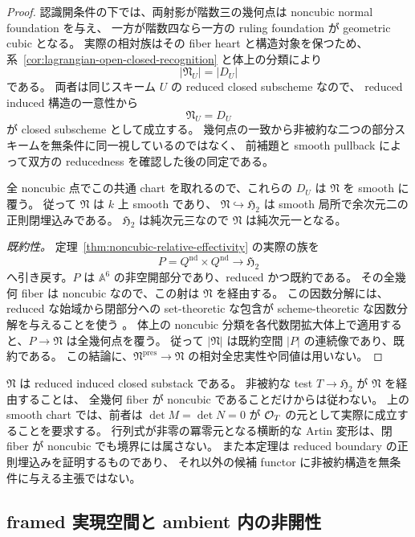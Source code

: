 \begin{proof}
認識開条件の下では、両射影が階数三の幾何点は noncubic normal foundation を与え、
一方が階数四なら一方の ruling foundation が geometric cubic となる。
実際の相対族はその fiber heart と構造対象を保つため、
系~\ref{cor:lagrangian-open-closed-recognition} と体上の分類により
\[
 |\mathfrak N_U|=|D_U|
\]
である。
両者は同じスキーム $U$ の reduced closed subscheme なので、
reduced induced 構造の一意性から
\[
 \mathfrak N_U=D_U
\]
が closed subscheme として成立する。
幾何点の一致から非被約な二つの部分スキームを無条件に同一視しているのではなく、
前補題と smooth pullback によって双方の reducedness を確認した後の同定である。

全 noncubic 点でこの共通 chart を取れるので、これらの $D_U$ は $\mathfrak N$ を smooth に覆う。
従って $\mathfrak N$ は $k$ 上 smooth であり、
$\mathfrak N\hookrightarrow\mathfrak H_2$ は smooth 局所で余次元二の正則閉埋込みである。
$\mathfrak H_2$ は純次元三なので $\mathfrak N$ は純次元一となる。

\emph{既約性。}
定理~\ref{thm:noncubic-relative-effectivity} の実際の族を
\[
 P=Q^{\mathrm{nd}}\times Q^{\mathrm{nd}}\longrightarrow\mathfrak H_2
\]
へ引き戻す。$P$ は $\mathbb A^6$ の非空開部分であり、reduced かつ既約である。
その全幾何 fiber は noncubic なので、この射は $\mathfrak N$ を経由する。
この因数分解には、reduced な始域から閉部分への set-theoretic な包含が
scheme-theoretic な因数分解を与えることを使う
\cite[Tag 050B, Lemma 100.10.3]{StacksReducedBoundary}。
体上の noncubic 分類を各代数閉拡大体上で適用すると、$P\to\mathfrak N$ は全幾何点を覆う。
従って $|\mathfrak N|$ は既約空間 $|P|$ の連続像であり、既約である。
この結論に、$\mathfrak N^{\mathrm{pres}}\to\mathfrak N$ の相対全忠実性や同値は用いない。
\end{proof}

\begin{remark}
$\mathfrak N$ は reduced induced closed substack である。
非被約な test $T\to\mathfrak H_2$ が $\mathfrak N$ を経由することは、
全幾何 fiber が noncubic であることだけからは従わない。
上の smooth chart では、前者は $\det M=\det N=0$ が
$\mathcal O_T$ の元として実際に成立することを要求する。
行列式が非零の冪零元となる横断的な Artin 変形は、閉 fiber が noncubic でも境界には属さない。
また本定理は reduced boundary の正則埋込みを証明するものであり、
それ以外の候補 functor に非被約構造を無条件に与える主張ではない。
\end{remark}

\subsection{framed 実現空間と ambient 内の非開性}

